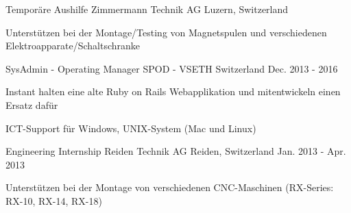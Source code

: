 \begin{cventries}
\cventry
	{Temporäre Aushilfe} %
	{Zimmermann Technik AG} %
	{Luzern, Switzerland} %
	{} %
	{
		\begin{cvitems} %
			\item {Unterstützen bei der Montage/Testing von Magnetspulen und verschiedenen Elektroapparate/Schaltschranke}
		\end{cvitems}
	}	

  \cventry
    {SysAdmin - Operating Manager} %
    {SPOD - VSETH} %
    {Switzerland} %
    {Dec. 2013 - 2016} %
    {
      \begin{cvitems} %
        \item {Instant halten eine alte Ruby on Rails Webapplikation und mitentwickeln einen Ersatz dafür}
        \item {ICT-Support für Windows, UNIX-System (Mac und Linux)}
      \end{cvitems}
    }

  \cventry
    {Engineering Internship} %
    {Reiden Technik AG} %
    {Reiden, Switzerland} %
    {Jan. 2013 - Apr. 2013} %
    {
      \begin{cvitems} %
        \item {Unterstützen bei der Montage von verschiedenen CNC-Maschinen (RX-Series: RX-10, RX-14, RX-18)}
      \end{cvitems}
    }


\end{cventries}
